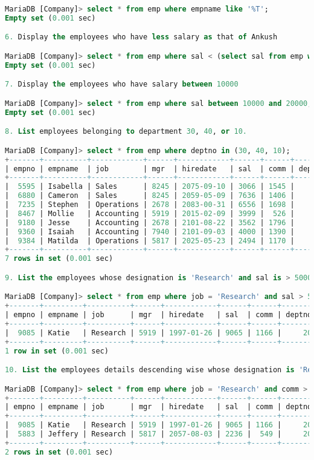 \documentclass[11pt]{article}
\begin{document}
\begin{lstlisting}[language=SQL]
MariaDB [Company]> select * from emp where empname like '%T';
Empty set (0.001 sec)

6. Display the employees who have less salary as that of Ankush

MariaDB [Company]> select * from emp where sal < (select sal from emp where empname = 'Ankush');
Empty set (0.001 sec)

7. Display the employees who have salary between 10000

MariaDB [Company]> select * from emp where sal between 10000 and 20000;
Empty set (0.001 sec)

8. List employees belonging to department 30, 40, or 10.

MariaDB [Company]> select * from emp where deptno in (30, 40, 10);
+-------+----------+------------+------+------------+------+------+--------+
| empno | empname  | job        | mgr  | hiredate   | sal  | comm | deptno |
+-------+----------+------------+------+------------+------+------+--------+
|  5595 | Isabella | Sales      | 8245 | 2075-09-10 | 3066 | 1545 |     30 |
|  6880 | Cameron  | Sales      | 8245 | 2059-05-09 | 7636 | 1406 |     30 |
|  7235 | Stephen  | Operations | 2678 | 2083-00-31 | 6556 | 1698 |     40 |
|  8467 | Mollie   | Accounting | 5919 | 2015-02-09 | 3999 |  526 |     10 |
|  9180 | Jesse    | Accounting | 2678 | 2101-08-22 | 3562 | 1796 |     10 |
|  9360 | Isaiah   | Accounting | 7940 | 2101-09-03 | 4000 | 1390 |     10 |
|  9384 | Matilda  | Operations | 5817 | 2025-05-23 | 2494 | 1170 |     40 |
+-------+----------+------------+------+------------+------+------+--------+
7 rows in set (0.001 sec)

9. List the employees whose designation is 'Research' and sal is > 5000.

MariaDB [Company]> select * from emp where job = 'Research' and sal > 5000;
+-------+---------+----------+------+------------+------+------+--------+
| empno | empname | job      | mgr  | hiredate   | sal  | comm | deptno |
+-------+---------+----------+------+------------+------+------+--------+
|  9085 | Katie   | Research | 5919 | 1997-01-26 | 9065 | 1166 |     20 |
+-------+---------+----------+------+------------+------+------+--------+
1 row in set (0.001 sec)

10. List the employees details descending wise whose designation is 'Research' and commission is > 500.

MariaDB [Company]> select * from emp where job = 'Research' and comm > 500 order by comm desc;
+-------+---------+----------+------+------------+------+------+--------+
| empno | empname | job      | mgr  | hiredate   | sal  | comm | deptno |
+-------+---------+----------+------+------------+------+------+--------+
|  9085 | Katie   | Research | 5919 | 1997-01-26 | 9065 | 1166 |     20 |
|  5883 | Jeffery | Research | 5817 | 2057-08-03 | 2236 |  549 |     20 |
+-------+---------+----------+------+------------+------+------+--------+
2 rows in set (0.001 sec)
	
\end{lstlisting}
\end{document}
